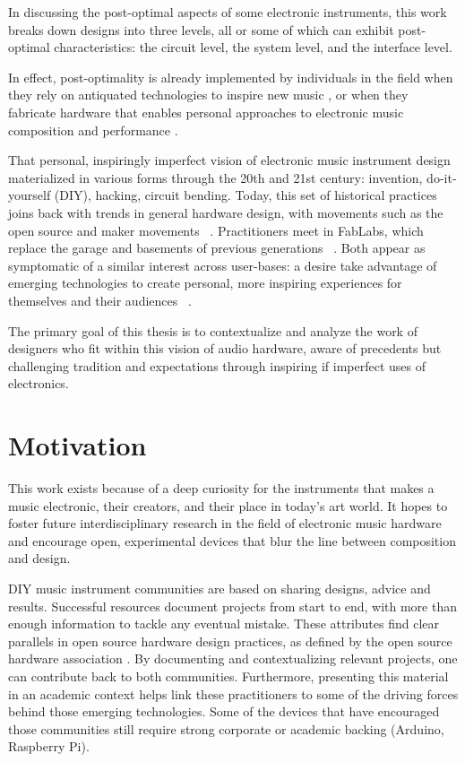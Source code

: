 In discussing the post-optimal aspects of some electronic instruments, this work breaks down designs into three levels, all or some of which can exhibit post-optimal characteristics: the circuit level, the system level, and the interface level.

In effect, post-optimality is already implemented by individuals in the field when they rely on antiquated technologies to inspire new music \citep{pelousek2014}, or when they fabricate hardware that enables personal approaches to electronic music composition and performance \citep{haslett2005,armstrong2006}.  

That personal, inspiringly imperfect vision of electronic music instrument design materialized in various forms through the 20th and 21st century: invention, do-it-yourself (DIY), hacking, circuit bending. Today, this set of historical practices joins back with trends in general hardware design, with movements such as the open source and maker movements ~\citep{mellis2014,perner2011}. Practitioners meet in FabLabs, which replace the garage and basements of previous generations ~\citep{mellis2011}. Both appear as symptomatic of a similar interest across user-bases: a desire take advantage of emerging technologies to create personal, more inspiring experiences for themselves and their audiences ~\citep{hermans2014}. 

The primary goal of this thesis is to contextualize and analyze the work of designers who fit within this vision of audio hardware, aware of precedents but challenging tradition and expectations through inspiring if imperfect uses of electronics.

\section{Motivation}

This work exists because of a deep curiosity for the instruments that makes a music electronic, their creators, and their place in today's art world. It hopes to foster future interdisciplinary research in the field of electronic music hardware and encourage open, experimental devices that blur the line between composition and design. 

DIY music instrument communities are based on sharing designs, advice and results. Successful resources document projects from start to end, with more than enough information to tackle any eventual mistake. These attributes find clear parallels in open source hardware design practices, as defined by the open source hardware association \citep{oshwa2015}. By documenting and contextualizing relevant projects, one can contribute back to both communities. Furthermore, presenting this material in an academic context helps link these practitioners to some of the driving forces behind those emerging technologies. Some of the devices that have encouraged those communities still require strong corporate or academic backing (Arduino, Raspberry Pi). 

